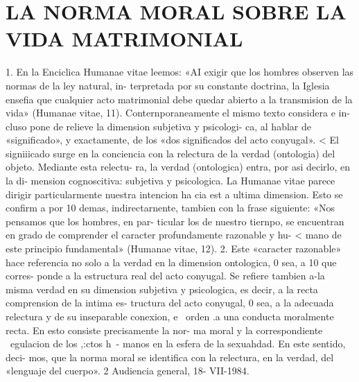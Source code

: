 \documentclass[letterpaper]{report}
\begin{document}
	{\centering
		\section{LA NORMA MORAL SOBRE LA VIDA MATRIMONIAL}
	}
		1. En la Enciclica Humanae vitae leemos: «AI exigir 
		que los hombres observen las normas de la ley natural, in- 
		terpretada por su constante doctrina, la Iglesia ensefia que 
		cualquier acto matrimonial debe quedar abierto a la 
		transmision de la vida» (Humanae vitae, 11). 
		Conternporaneamente el mismo texto considera e in- 
		cluso pone de relieve la dimension subjetiva y psicologi- 
		ca, al hablar de «significado», y exactamente, de los «dos 
		significados del acto conyugal». 	< 
		El signiiicado surge en la conciencia con la relectura 
		de la verdad (ontologia) del objeto. Mediante esta relectu- 
		ra, la verdad (ontologica) entra, por asi decirlo, en la di- 
		mension cognoscitiva: subjetiva y psicologica. 
		La Humanae vitae parece dirigir particularmente 
		nuestra intencion ha cia est a ultima dimension. Esto se 
		confirm a por 10 demas, indirectarnente, tambien con la 
		frase siguiente: «Nos pensamos que los hombres, en par- 
		ticular los de nuestro tiernpo, se encuentran en grado de 
		comprender el caracter profundamente razonable y hu- 
		< mano de este principio fundamental» (Humanae vitae, 12). 
		2. Este «caracter razonable» hace referencia no solo a 
		la verdad en la dimension ontologica, 0 sea, a 10 que corres- 
		ponde a la estructura real del acto conyugal. Se refiere
		tambien a-la misma verdad en su dimension subjetiva y 
		psicologica, es decir, a la recta comprension de la intima es- 
		tructura del acto conyugal, 0 sea, a la adecuada relectura 
		y de su inseparable conexion, e~ orden .a una conducta 
		moralmente recta. En esto consiste precisamente la nor- 
		ma moral y la correspondiente ~egulacion de los ,:ctos h~- 
		manos en la esfera de la sexuahdad. En este sentido, deci- 
		mos, que la norma moral se identifica con la relectura, en 
		la verdad, del «lenguaje del cuerpo».  
		2 Audiencia general, 18- VII-1984.
		
\end{document}
